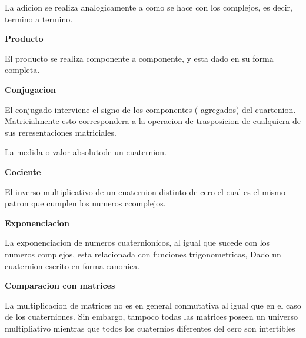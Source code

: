 \documentclass[10pt,a4paper]{report}
\begin{document}
\begin{center}
\begin{flushleft}
\begin{flushleft}
\begin{flushleft}
\begin{flushleft}
\begin{flushleft}
\begin{flushleft}
\begin{flushleft}
\begin{flushleft}
La adicion se realiza analogicamente a como se hace con los complejos, es decir, termino a termino.
\begin{flushleft}
\textbf{Producto}
\begin{flushleft}
El producto se realiza componente a componente, y esta dado en su forma completa.
\begin{flushleft}
\textbf{Conjugacion}
\begin{flushleft}
El conjugado interviene el signo de los componentes ( agregados) del cuartenion. Matricialmente esto correspondera a la operacion de trasposicion de cualquiera de sus reresentaciones matriciales.
\begin{flushleft}
La medida o valor absolutode un cuaternion.
\begin{flushleft}
\textbf{Cociente}
\end{flushleft}

\begin{flushleft}
El inverso multiplicativo de un cuaternion distinto de cero el cual es el mismo patron que cumplen los numeros ccomplejos.
\begin{flushleft}
\textbf{Exponenciacion}

\begin{flushleft}
La exponenciacion de numeros cuaternionicos, al igual que sucede con los numeros complejos, esta relacionada con funciones trigonometricas, Dado un cuaternion escrito en forma canonica.
\begin{flushleft}
\textbf{Comparacion con matrices}
\begin{flushleft}
La multiplicacion de matrices no es en general conmutativa al igual que en el caso de los cuaterniones. Sin embargo, tampoco todas las matrices poseen un universo multipliativo mientras que todos los cuaternios diferentes del cero son intertibles 
\end{flushleft}
\end{flushleft}
\end{flushleft}
\end{flushleft}
\end{flushleft}
\end{flushleft}
\end{flushleft}
\end{flushleft}
\end{flushleft}
\end{flushleft}
\end{flushleft}
\end{flushleft}
\end{flushleft}

\end{flushleft}
\end{flushleft}
\end{flushleft}
\end{flushleft}
\end{flushleft}
\end{center}
\end{document}
